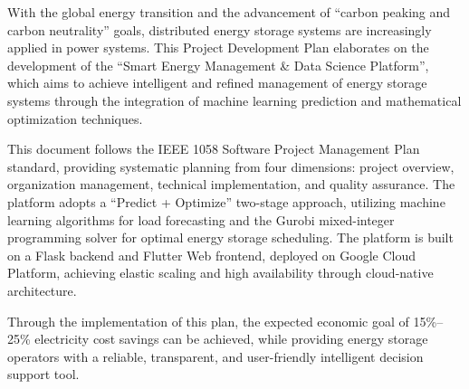 \begin{abstract}
    随着全球能源结构转型和``双碳''目标的推进，分布式储能系统在电力系统中的应用日益广泛。本项目开发计划书详细阐述了``智能能源管理与数据科学平台''的开发规划，该平台旨在通过集成机器学习预测与数学优化求解技术，实现储能系统的智能化、精细化管理。

    本文档遵循IEEE 1058软件项目管理计划标准，从项目概述、组织管理、技术实施、质量保障四个维度进行了系统性规划。项目采用``预测+优化''的两阶段技术路线，利用机器学习算法实现负载预测，利用Gurobi混合整数规划求解器实现储能调度优化。平台基于Flask后端与Flutter Web前端构建，部署于Google Cloud Platform，实现云原生架构的弹性伸缩与高可用保障。

    通过本计划书的实施，预期可实现电费节省15\%--25\%的经济目标，同时为储能系统运营商提供一套可靠、透明、易用的智能决策支持工具。

\end{abstract}

\begin{abstract*}
    With the global energy transition and the advancement of ``carbon peaking and carbon neutrality'' goals, distributed energy storage systems are increasingly applied in power systems. This Project Development Plan elaborates on the development of the ``Smart Energy Management \& Data Science Platform'', which aims to achieve intelligent and refined management of energy storage systems through the integration of machine learning prediction and mathematical optimization techniques.

    This document follows the IEEE 1058 Software Project Management Plan standard, providing systematic planning from four dimensions: project overview, organization management, technical implementation, and quality assurance. The platform adopts a ``Predict + Optimize'' two-stage approach, utilizing machine learning algorithms for load forecasting and the Gurobi mixed-integer programming solver for optimal energy storage scheduling. The platform is built on a Flask backend and Flutter Web frontend, deployed on Google Cloud Platform, achieving elastic scaling and high availability through cloud-native architecture.

    Through the implementation of this plan, the expected economic goal of 15\%--25\% electricity cost savings can be achieved, while providing energy storage operators with a reliable, transparent, and user-friendly intelligent decision support tool.

\end{abstract*}